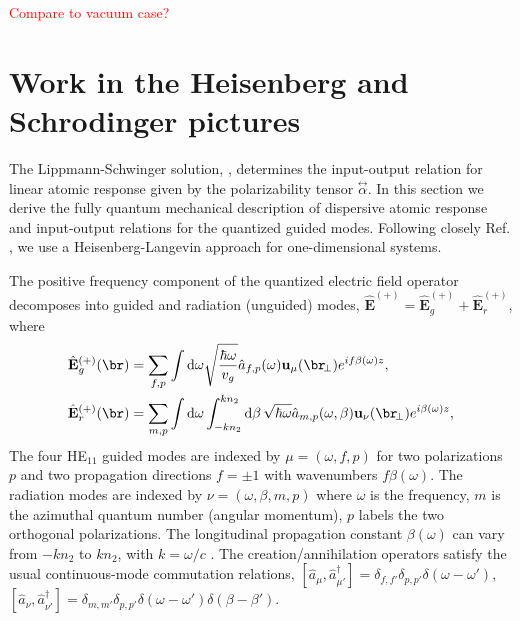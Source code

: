 \documentclass[]{report}
\newcommand{\tensor}[1]{\overset{\leftrightarrow}{#1}} %
\newcommand{\awg}{\hat{a}_{f,p}(\omega)}
\newcommand{\awr}{\hat{a}_{m,p}(\omega,\beta)}
\begin{document}
\textcolor{red}{Compare to vacuum case?}


\section{Work in the Heisenberg and Schrodinger pictures}
The Lippmann-Schwinger solution, , determines the input-output relation for linear atomic response given by the polarizability tensor $\tensor{\alpha}$.  In this section we derive the fully quantum mechanical description of dispersive atomic response and input-output relations for the quantized guided modes.  Following closely Ref. \cite{LeKien2005a}, we use a Heisenberg-Langevin approach for one-dimensional systems.  

The positive frequency component of the quantized electric field operator decomposes into guided and radiation (unguided) modes, $\hat{\mathbf{E}}^{(+)}=\hat{\mathbf{E}}_g^{(+)}+\hat{\mathbf{E}}_{r}^{(+)}$, where
	\begin{align}
		\hat{\mathbf{E}}_g^{(+)}(\br) &= \sum_{f,p} \int \mathrm{d}\omega  \sqrt{\frac{ \hbar \omega}{ v_g}} \awg \mathbf{u}_\mu (\br\!_\perp) e^{i f\beta(\omega) z } ,\label{Eq::QuantizedElectricField} \\
		\hat{\mathbf{E}}_r^{(+)}(\br) &= \sum_{m,p} \int \mathrm{d}\omega   \int_{-kn_2}^{kn_2}\mathrm{d}\beta \, \sqrt{ \hbar \omega}\awr \mathbf{u}_\nu (\br\!_\perp) e^{i\beta(\omega) z },
	\end{align}
The four HE$_{11}$ guided modes are indexed by $\mu =(\omega, f, p)$ for two polarizations $p$ and two propagation directions $f=\pm1$ with wavenumbers $f\beta (\omega)$.  The radiation modes are indexed by  $\nu=(\omega, \beta, m, p)$ where $\omega$ is the frequency, $m$ is the azimuthal quantum number (angular momentum), $p$ labels the two orthogonal polarizations. The longitudinal propagation constant $\beta(\omega)$ can vary from $-kn_2$ to $kn_2$, with $k = \omega/c$ \cite{Sondergaard2001,LeKien2005a}.  The creation/annihilation operators satisfy the usual continuous-mode commutation relations, $[\hat{a}_\mu, \hat{a}^\dag_{\mu'} ] = \delta_{f,f'} \delta_{p,p'} \delta ( \omega - \omega ') $, $[\hat{a}_\nu ,\hat{a}^\dag_{\nu'} ] = \delta_{m,m'} \delta_{p,p'} \delta ( \omega - \omega ')  \delta ( \beta - \beta') $.
\end{document}
